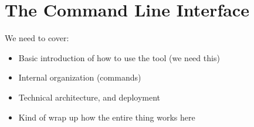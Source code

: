 
\section{The Command Line Interface}

We need to cover:

\begin{itemize}
\item Basic introduction of how to use the tool (we need this)
\item Internal organization (commands)
\item Technical architecture, and deployment
\item Kind of wrap up how the entire thing works here
\end{itemize}

